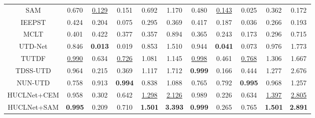 \begin{table*}[!t]
{\begin{tabular}{ccccccccccc}
                                    SAM         & 0.670          & \underline{0.129}    & 0.151          & 0.692          & 1.170          & 0.480          & \underline{0.143}    & 0.025          & 0.362          & 0.172          \\
                                    IEEPST      & 0.424          & 0.204          & 0.075          & 0.295          & 0.369          & 0.417          & 0.187          & 0.036          & 0.266          & 0.193          \\
                                    MCLT        & 0.401          & 0.422          & 0.377          & 0.357          & 0.894          & 0.365          & 0.243          & 0.173          & 0.296          & 0.715          \\
                                    UTD-Net     & 0.846          & \textbf{0.013} & 0.019          & 0.853          & 1.510          & 0.944          & \textbf{0.041} & 0.073          & 0.976          & 1.773          \\
                                    TUTDF       & \underline{0.990}          & 0.634          & \underline{0.726}    & 1.081          & 1.145          & \underline{0.998}          & 0.461          & \underline{0.768}    & 1.306          & 1.667          \\
                                    TDSS-UTD    & 0.964          & 0.215          & 0.369          & 1.117          & 1.712          & \textbf{0.999} & 0.166          & 0.444          & 1.277          & 2.676          \\
                                    NUN-UTD     & 0.758          & 0.913          & \textbf{0.994} & 0.838          & 1.088          & 0.765          & 0.792          & \textbf{0.995} & 0.968          & 1.257          \\
            \rowcolor{tablecolor13!60}HUCLNet+CEM & 0.958    & 0.302          & 0.642          & \underline{1.298}    & \underline{2.126}    & 0.989    & 0.226          & 0.634          & \underline{1.397}    & \underline{2.805}    \\
            \rowcolor{tablecolor14!60}HUCLNet+SAM & \textbf{0.995} & 0.209          & 0.710          & \textbf{1.501} & \textbf{3.393} & \textbf{0.999} & 0.265          & 0.765          & \textbf{1.501} & \textbf{2.891} \\ \hline
        \end{tabular}}
\end{table*}
